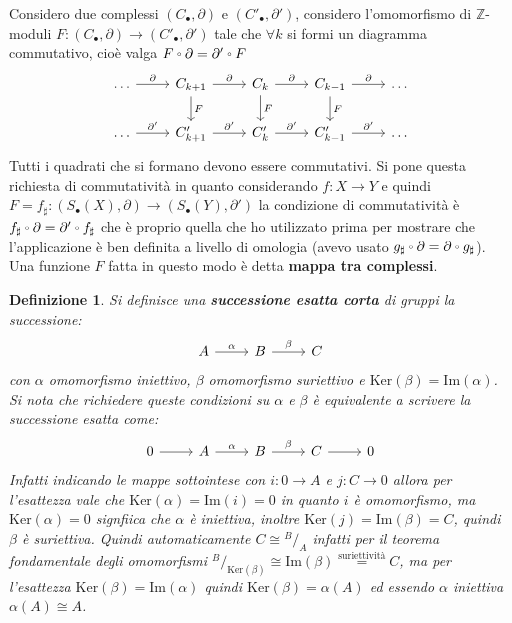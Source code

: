 \documentclass[10pt, twoside=false, x11names]{scrbook}
\newtheorem{definition}[theorem]{Definizione}
\newcommand{\Z}{\mathbb{Z}}
\newcommand{\im}[1]{\mathrm{Im}( #1 )}
\renewcommand{\ker}[1]{\mathrm{Ker}( #1)}
\newcommand*\quot[2]{{^{\textstyle #1}\big/_{\textstyle #2}}}
\let\latexcirc=\circ
\newcommand{\ccirc}{\mathbin{\mathchoice
  {\xcirc\scriptstyle}
  {\xcirc\scriptstyle}
  {\xcirc\scriptscriptstyle}
  {\xcirc\scriptscriptstyle}
}}
\newcommand{\xcirc}[1]{\vcenter{\hbox{$#1\latexcirc$}}}
\let\circ\ccirc
\begin{document}
Considero due complessi $ (C_\bullet, \partial) $ e $ (C'_\bullet, \partial') $,
considero l'omomorfismo di $ \Z $-moduli $ F \colon (C_\bullet, \partial) \to (C'_\bullet, \partial') $
tale che $ \forall k $ si formi un diagramma commutativo,
cioè valga $ F \circ \partial = \partial' \circ F $
\[
  \begin{tikzcd}
    \dots \arrow{r}{\partial} &  C_{k+1}  \arrow{r}{\partial} \arrow{d}{F} &  C_{k}  \arrow{r}{\partial} \arrow{d}{F} & C_{k-1}  \arrow{r}{\partial} \arrow{d}{F} & \dots \\
    \dots \arrow{r}{\partial'} &  C'_{k+1}  \arrow{r}{\partial'} &  C'_{k}  \arrow{r}{\partial'}  &  C'_{k-1} \arrow{r}{\partial'} & \dots
  \end{tikzcd}
\]
Tutti i quadrati che si formano devono essere
commutativi. Si pone questa richiesta di commutatività
in quanto considerando $ f \colon X \to Y $ e quindi
$ F = f_\sharp \colon (S_\bullet(X), \partial) \to  (S_\bullet(Y), \partial') $ la condizione
di commutatività è $ f_\sharp \circ \partial = \partial' \circ f_\sharp $ che è
proprio quella che ho utilizzato prima per mostrare
che l'applicazione è ben definita a livello
di omologia (avevo usato $ g_\sharp \circ \partial = \partial \circ g_\sharp $).
Una funzione $ F $ fatta in questo modo è detta
\textbf{mappa tra complessi}.

\begin{definition}
  Si definisce una \textbf{successione esatta corta} di
  gruppi la successione:
  \[
    \begin{tikzcd}
      A \arrow{r}{\alpha} & B \arrow{r}{\beta} & C
    \end{tikzcd}
  \]
  con $ \alpha $ omomorfismo iniettivo, $ \beta $ omomorfismo suriettivo e $ \ker{\beta} = \im{\alpha} $.
  Si nota che richiedere queste condizioni su $ \alpha $ e $ \beta $ è equivalente a scrivere la
  successione esatta come:
  \[
    \begin{tikzcd}
      0 \arrow{r}{} & A \arrow{r}{\alpha} & B\arrow{r}{\beta} & C \arrow{r}{} & 0
    \end{tikzcd}
  \]
  Infatti indicando le mappe sottointese con $ i \colon 0 \to A $ e $ j \colon C \to 0 $
  allora per l'esattezza vale che $ \ker{\alpha} = \im{i} = 0 $ in quanto $ i $ è
  omomorfismo, ma $ \ker{\alpha} = 0 $ signfiica che $ \alpha $ è iniettiva, inoltre
  $ \ker{j} = \im{\beta} = C $, quindi $ \beta $ è suriettiva. Quindi automaticamente
  $ C \cong \quot{B}{A} $ infatti per il teorema fondamentale degli omomorfismi
  $ \quot{B}{\ker{\beta}} \cong \im{\beta} \overset{\text{suriettività}}{=} C $, ma per
  l'esattezza $ \ker{\beta} = \im{\alpha} $ quindi $ \ker{\beta} = \alpha(A) $ ed essendo $ \alpha $
  iniettiva $ \alpha(A) \cong A $.
\end{definition}
\end{document}

